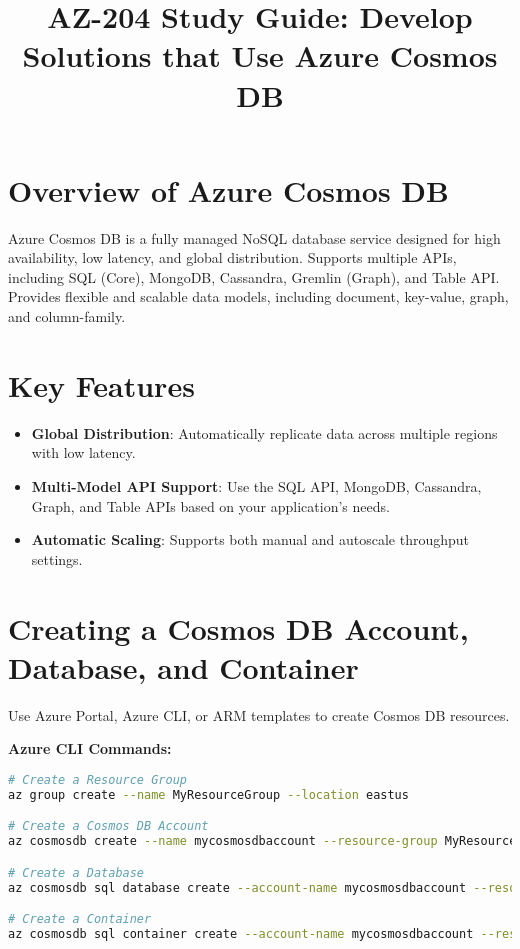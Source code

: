 \documentclass{article}
\title{AZ-204 Study Guide: Develop Solutions that Use Azure Cosmos DB}
\author{}
\date{}
\begin{document}
\maketitle

\section{Overview of Azure Cosmos DB}
Azure Cosmos DB is a fully managed NoSQL database service designed for high availability, low latency, and global distribution. Supports multiple APIs, including SQL (Core), MongoDB, Cassandra, Gremlin (Graph), and Table API. Provides flexible and scalable data models, including document, key-value, graph, and column-family.

\section{Key Features}
\begin{itemize}
    \item \textbf{Global Distribution}: Automatically replicate data across multiple regions with low latency.
    \item \textbf{Multi-Model API Support}: Use the SQL API, MongoDB, Cassandra, Graph, and Table APIs based on your application's needs.
    \item \textbf{Automatic Scaling}: Supports both manual and autoscale throughput settings.
\end{itemize}

\section{Creating a Cosmos DB Account, Database, and Container}
Use Azure Portal, Azure CLI, or ARM templates to create Cosmos DB resources.

\textbf{Azure CLI Commands:}
\begin{lstlisting}[language=bash]
# Create a Resource Group
az group create --name MyResourceGroup --location eastus

# Create a Cosmos DB Account
az cosmosdb create --name mycosmosdbaccount --resource-group MyResourceGroup --kind MongoDB

# Create a Database
az cosmosdb sql database create --account-name mycosmosdbaccount --resource-group MyResourceGroup --name mydatabase

# Create a Container
az cosmosdb sql container create --account-name mycosmosdbaccount --resource-group MyResourceGroup --database-name mydatabase --name mycontainer --partition-key-path "/partitionKey"
\end{lstlisting}
\end{document}

